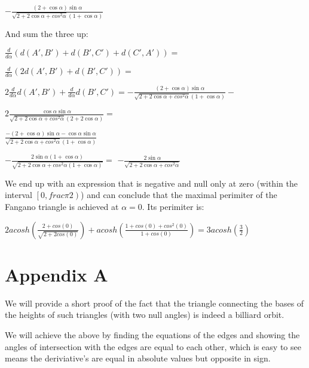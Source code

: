 \documentclass[a4paper,10pt]{article}
\begin{document}
$- \frac{\left(2 + \cos{\alpha}\right) \sin{\alpha}}{\sqrt{2 + 2 \cos{\alpha} + cos^{2}{\alpha}} \left(1 + \cos{\alpha}\right)}$

\noindent
And sum the three up:

\noindent$\frac{d}{d\alpha}\left(d\left(A', B'\right) + d\left(B', C'\right) + d\left(C', A'\right)\right) = $

$\frac{d}{d\alpha}\left(2d\left(A', B'\right) + d\left(B', C'\right)\right) = $

$2\frac{d}{d\alpha}d\left(A', B'\right) + \frac{d}{d\alpha}d\left(B', C'\right) = 
 - \frac{\left(2 + \cos{\alpha}\right) \sin{\alpha}}{\sqrt{2 + 2 \cos{\alpha} + cos^{2}{\alpha}} \left(1 + \cos{\alpha}\right)} - $
  
$  2\frac{\cos{\alpha} \sin{\alpha}}
  {\sqrt{2 + 2 \cos{\alpha} + cos^{2}{\alpha}} \left(2 + 2 \cos{\alpha}\right)} =$

$  \frac{-\left(2 + \cos{\alpha}\right) \sin{\alpha} - \cos{\alpha} \sin{\alpha}}{\sqrt{2 + 2 \cos{\alpha} + cos^{2}{\alpha}} \left(1 + \cos{\alpha}\right)} $

$- \frac{2\sin{\alpha}\left(1 + \cos{\alpha}\right)}{\sqrt{2 + 2 \cos{\alpha} + cos^{2}{\alpha}\left(1 + \cos{\alpha}\right)}} =$
$- \frac{2\sin{\alpha}}{\sqrt{2 + 2 \cos{\alpha} + cos^{2}{\alpha}}}$

\noindent
We end up with an expression that is negative and null only at zero (within the
interval $\left[0,frac{\pi}{2}\right)$) and can conclude that the maximal perimiter
of the Fangano triangle is achieved at $\alpha = 0$. Its perimiter is:

\begin{center}
$2acosh\left(\frac{2 + cos\left(0\right)}{\sqrt{2 + 2 cos\left(0\right)}}\right) + 
acosh\left(\frac{1 + cos\left(0\right) + cos^{2}\left(0\right)}{1 + cos\left(0\right)}\right) =
3acosh\left(\frac{3}{2}\right)$
\end{center}


\section{Appendix A}
We will provide a short proof of the fact that the triangle connecting the bases
of the heights of such triangles (with two null angles) is indeed a billiard orbit.
 
We will achieve the above by finding the equations of the edges and showing the
angles of intersection with the edges are equal to each other, which is easy to
see means the deriviative's are equal in absolute values but opposite in sign.
\end{document}
